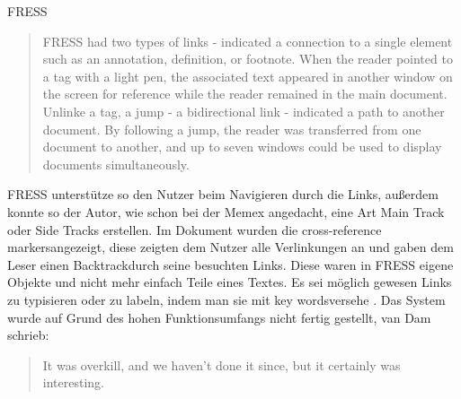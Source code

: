 \begin{section}{FRESS}
\begin{quote}
\glqq FRESS had two types of links - indicated a connection to a single element such as an annotation, definition, or footnote. When the reader pointed to a tag with a light pen, the associated text appeared in another window on the screen for reference while the reader remained in the main document. Unlinke a tag, a jump - a bidirectional link - indicated a path to another document. By following a jump, the reader was transferred from one document to another, and up to seven windows could be used to display documents simultaneously. \grqq{ }\cite[S.68]{GeorgeLandow1995}
\end{quote}

FRESS unterstütze so den Nutzer beim Navigieren durch die Links, außerdem konnte so der Autor, wie schon bei der Memex angedacht, eine Art Main Track oder Side Tracks erstellen. Im Dokument wurden die \glqq cross-reference markers\grqq{ }angezeigt, diese zeigten dem Nutzer alle Verlinkungen an und gaben dem Leser einen \glqq Backtrack\grqq{ }durch seine besuchten Links. Diese waren in FRESS eigene Objekte und nicht mehr einfach Teile eines Textes. Es sei möglich gewesen Links zu typisieren oder zu labeln, indem man sie mit \glqq key words\grqq{ }versehe \cite[S.891]{Dam1988}. Das System wurde auf Grund des hohen Funktionsumfangs nicht fertig gestellt, van Dam schrieb:

\begin{quote}
\glqq It was overkill, and we haven’t done it since, but it certainly was interesting.\grqq{ }\cite[S.891]{Dam1988}
\end{quote} 

\end{section}

